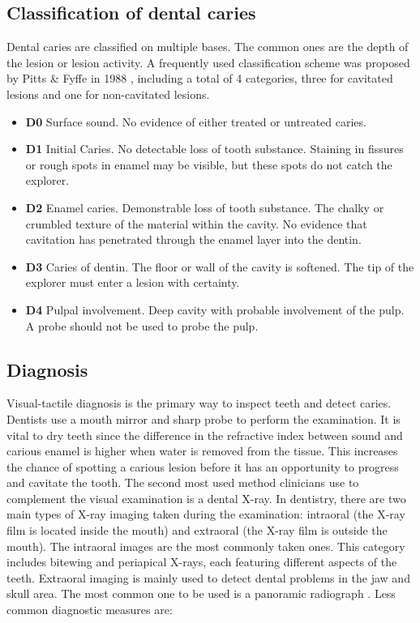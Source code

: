 \subsection{Classification of dental caries}
\label{sec:caries_classification}
Dental caries are classified on multiple bases. The common ones are the depth of the lesion or lesion activity. \newline
A frequently used classification scheme was proposed by Pitts \& Fyffe in 1988 \cite{2019a}, including a total of 4 categories, three for cavitated lesions and one for non-cavitated lesions.
\begin{itemize}
    \item \textbf{D0} Surface sound. No evidence of either treated or untreated caries.
    \item \textbf{D1} Initial Caries. No detectable loss of tooth substance. Staining in fissures or rough spots in enamel may be visible, but these spots do not catch the explorer.
    \item \textbf{D2} Enamel caries. Demonstrable loss of tooth substance. The chalky or crumbled texture of the material within the cavity. No evidence that cavitation has penetrated through the enamel layer into the dentin.
    \item \textbf{D3} Caries of dentin. The floor or wall of the cavity is softened. The tip of the explorer must enter a lesion with certainty.
    \item \textbf{D4} Pulpal involvement. Deep cavity with probable involvement of the pulp. A probe should not be used to probe the pulp.
\end{itemize}

\subsection{Diagnosis}
Visual-tactile diagnosis is the primary way to inspect teeth and detect caries. Dentists use a mouth mirror and sharp probe to perform the examination. It is vital to dry teeth since the difference in the refractive index between sound and carious enamel is higher when water is removed from the tissue. This increases the chance of spotting a carious lesion before it has an opportunity to progress and cavitate the tooth.
The second most used method clinicians use to complement the visual examination is a dental X-ray. In dentistry, there are two main types of X-ray imaging taken during the examination: intraoral (the X-ray film is located inside the mouth) and extraoral (the X-ray film is outside the mouth). The intraoral images are the most commonly taken ones. This category includes bitewing and periapical X-rays, each featuring different aspects of the teeth. Extraoral imaging is mainly used to detect dental problems in the jaw and skull area. The most common one to be used is a panoramic radiograph \cite{2015}. \newline
Less common diagnostic measures are:

